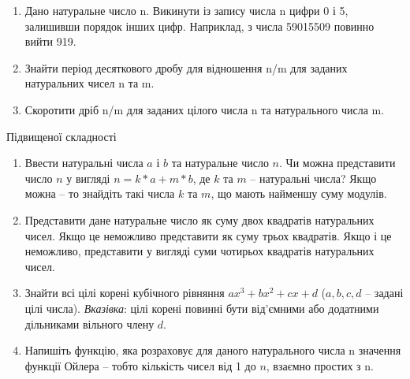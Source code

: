 \documentclass[]{article}
\makeatletter
\newcommand{\xslalph}[1]{\expandafter\@xslalph\csname c@#1\endcsname}
\newcommand{\@xslalph}[1]{%
    \ifcase#1\or а\or б\or в\or г\or д\or e\or є\or ж\or з\or i%
    \or й\or к\or л\or м\or н\or о\or п\or р\or с\or т%
    \or у\or ф\or х\or ц\or ч\or ш\or ю\or я\or аа\or бб\or вв %
    \else\@ctrerr\fi%
}
\makeatother
\begin{document}
\begin{enumerate}
\begin{enumerate}[label=\xslalph*)]

\item \(\max(\left| z_{1} \right|,\ldots,\left| z_{n} \right|),\) де
\(z_{i} = \left\{ \begin{matrix}
y_{i},\textup{ при }\left| y_{i} \right| \leq 2, \\
0.5,\textup{у інших випадках} \\
\end{matrix} \right.\ \);
\item \(\min(\left| z_{1} \right|,\ldots,\left| z_{n} \right|),\) де
\(z_{i} = \left\{ \begin{matrix}
 y_{i},\textup{ при}\ \left| y_{i} \right| \geq 1, \\
 2,\textup{у інших випадках} \\
\end{matrix} \right.\ \);
\item \(z_{1} + z_{2} + \ldots + z_{n},\) де
\(z_{i} = \left\{ \begin{matrix}
 y_{i},\textup{ при } {y}_{i} < 10, \\
 1,\textup{у інших випадках} \\
\end{matrix} \right.\ \)
 \end{enumerate}

\item
  Дано натуральне число n. Викинути із запису числа n цифри 0 і 5,
  залишивши порядок інших цифр. Наприклад, з числа 59015509 повинно
  вийти 919.
\item
  Знайти період десяткового дробу для відношення n/m для заданих
  натуральних чисел n та m.
\item
  Скоротити дріб n/m для заданих цілого числа n та натурального числа m.
\end{enumerate}

Підвищеної складності

\begin{enumerate}
\def\labelenumi{\arabic{enumi})}
\setcounter{enumi}{26}
\item
  Ввести натуральні числа $a$ і $b$ та натуральне число $n$. Чи можна
  представити число $n$ у вигляді $n= k*a + m*b$, де $k$ та $m$ -- натуральні
  числа? Якщо можна -- то знайдіть такі числа $k$ та $m$, що мають найменшу
  суму модулів.
\item
  Представити дане натуральне число як суму двох квадратів натуральних
  чисел. Якщо це неможливо представити як суму трьох квадратів. Якщо і
  це неможливо, представити у вигляді суми чотирьох квадратів
  натуральних чисел.
\item
  Знайти всі цілі корені кубічного рівняння $ax^3 + bx^2 + cx + d$ ($a,b,c,d$ 
-- задані цілі числа). \emph{Вказівка}: цілі корені повинні бути від'ємними
 або додатними дільниками вільного члену $d$.
\item
  Напишіть функцію, яка розраховує для даного натурального числа n
  значення функції Ойлера -- тобто кількість чисел від 1 до $n$, взаємно простих з
  n.

\end{enumerate}
\end{document}
